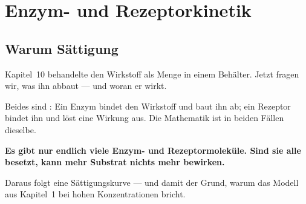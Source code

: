 \chapter{Enzym- und Rezeptorkinetik}

\section{Warum Sättigung}

\begin{merksatz}
Kapitel~10 behandelte den Wirkstoff als Menge in einem Behälter. Jetzt fragen wir, was ihn abbaut --- und woran er wirkt.

\begin{center}
\begin{minipage}{0.9\textwidth}
Beides sind : Ein Enzym bindet den Wirkstoff und baut ihn ab; ein Rezeptor bindet ihn und löst eine Wirkung aus. Die Mathematik ist in beiden Fällen dieselbe.
\end{minipage}
\end{center}

\begin{center}
\begin{minipage}{0.9\textwidth}
\textbf{Es gibt nur endlich viele Enzym- und Rezeptormoleküle. Sind sie alle besetzt, kann mehr Substrat nichts mehr bewirken.}
\end{minipage}
\end{center}

Daraus folgt eine Sättigungskurve --- und damit der Grund, warum das Modell aus Kapitel~1 bei hohen Konzentrationen bricht.
\end{merksatz}

